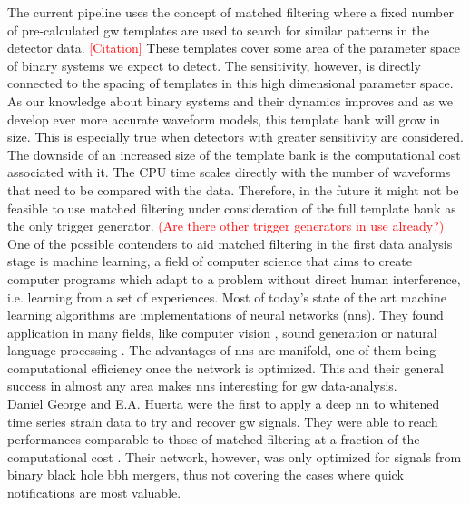 The current pipeline uses the concept of matched filtering where a fixed number of pre-calculated \gls{gw} templates are used to search for similar patterns in the detector data. \textcolor{red}{[Citation]} These templates cover some area of the parameter space of binary systems we expect to detect. The sensitivity, however, is directly connected to the spacing of templates in this high dimensional parameter space. As our knowledge about binary systems and their dynamics improves and as we develop ever more accurate waveform models, this template bank will grow in size. This is especially true when detectors with greater sensitivity are considered. The downside of an increased size of the template bank is the computational cost associated with it. The CPU time scales directly with the number of waveforms that need to be compared with the data. Therefore, in the future it might not be feasible to use matched filtering under consideration of the full template bank as the only trigger generator. \textcolor{red}{(Are there other trigger generators in use already?)}\\
One of the possible contenders to aid matched filtering in the first data analysis stage is machine learning, a field of computer science that aims to create computer programs which adapt to a problem without direct human interference, i.e. learning from a set of experiences. Most of today's state of the art machine learning algorithms are implementations of neural networks (\gls{nns}). They found application in many fields, like computer vision \cite{ILSVRC15}, sound generation or natural language processing \cite{natural_language_processing}. The advantages of \gls{nns} are manifold, one of them being computational efficiency once the network is optimized. This and their general success in almost any area makes \gls{nns} interesting for \gls{gw} data-analysis.\\
Daniel George and E.A. Huerta were the first to apply a deep \gls{nn} to whitened time series strain data to try and recover \gls{gw} signals. They were able to reach performances comparable to those of matched filtering at a fraction of the computational cost \cite{original_deep_filtering}. Their network, however, was only optimized for signals from binary black hole \gls{bbh} mergers, thus not covering the cases where quick notifications are most valuable.\\

